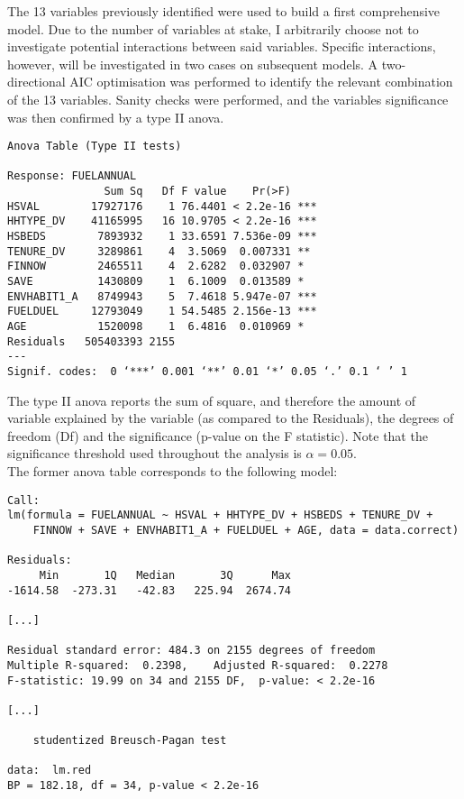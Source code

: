 \documentclass[12pt]{article}
\begin{document}
The 13 variables previously identified were used to build a first comprehensive model. Due to the number of variables at stake, I arbitrarily choose not to investigate potential interactions between said variables. Specific interactions, however, will be investigated in two cases on subsequent models. A two-directional AIC optimisation was performed to identify the relevant combination of the 13 variables. Sanity checks were performed, and the variables significance was then confirmed by a type II anova.

\begin{Answer}
\begin{verbatim}
Anova Table (Type II tests)

Response: FUELANNUAL
               Sum Sq   Df F value    Pr(>F)    
HSVAL        17927176    1 76.4401 < 2.2e-16 ***
HHTYPE_DV    41165995   16 10.9705 < 2.2e-16 ***
HSBEDS        7893932    1 33.6591 7.536e-09 ***
TENURE_DV     3289861    4  3.5069  0.007331 ** 
FINNOW        2465511    4  2.6282  0.032907 *  
SAVE          1430809    1  6.1009  0.013589 *  
ENVHABIT1_A   8749943    5  7.4618 5.947e-07 ***
FUELDUEL     12793049    1 54.5485 2.156e-13 ***
AGE           1520098    1  6.4816  0.010969 *  
Residuals   505403393 2155                      
---
Signif. codes:  0 ‘***’ 0.001 ‘**’ 0.01 ‘*’ 0.05 ‘.’ 0.1 ‘ ’ 1
\end{verbatim}
\end{Answer}

The type II anova reports the sum of square, and therefore the amount of variable explained by the variable (as compared to the Residuals), the degrees of freedom (Df) and the significance (p-value on the F statistic). Note that the significance threshold used throughout the analysis is $\alpha = 0.05$.\\

The former anova table corresponds to the following model:

\begin{Answer}
\begin{verbatim}
Call:
lm(formula = FUELANNUAL ~ HSVAL + HHTYPE_DV + HSBEDS + TENURE_DV + 
    FINNOW + SAVE + ENVHABIT1_A + FUELDUEL + AGE, data = data.correct)

Residuals:
     Min       1Q   Median       3Q      Max 
-1614.58  -273.31   -42.83   225.94  2674.74 

[...]

Residual standard error: 484.3 on 2155 degrees of freedom
Multiple R-squared:  0.2398,	Adjusted R-squared:  0.2278 
F-statistic: 19.99 on 34 and 2155 DF,  p-value: < 2.2e-16

[...]

	studentized Breusch-Pagan test

data:  lm.red
BP = 182.18, df = 34, p-value < 2.2e-16
\end{verbatim}
\end{Answer}
\end{document}

